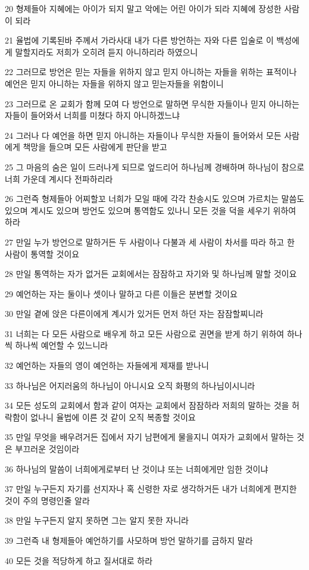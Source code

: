 \par 20 형제들아 지혜에는 아이가 되지 말고 악에는 어린 아이가 되라 지혜에 장성한 사람이 되라
\par 21 율법에 기록된바 주께서 가라사대 내가 다른 방언하는 자와 다른 입술로 이 백성에게 말할지라도 저희가 오히려 듣지 아니하리라 하였으니
\par 22 그러므로 방언은 믿는 자들을 위하지 않고 믿지 아니하는 자들을 위하는 표적이나 예언은 믿지 아니하는 자들을 위하지 않고 믿는자들을 위함이니
\par 23 그러므로 온 교회가 함께 모여 다 방언으로 말하면 무식한 자들이나 믿지 아니하는 자들이 들어와서 너희를 미쳤다 하지 아니하겠느냐
\par 24 그러나 다 예언을 하면 믿지 아니하는 자들이나 무식한 자들이 들어와서 모든 사람에게 책망을 들으며 모든 사람에게 판단을 받고
\par 25 그 마음의 숨은 일이 드러나게 되므로 엎드리어 하나님께 경배하며 하나님이 참으로 너희 가운데 계시다 전파하리라
\par 26 그런즉 형제들아 어찌할꼬 너희가 모일 때에 각각 찬송시도 있으며 가르치는 말씀도 있으며 계시도 있으며 방언도 있으며 통역함도 있나니 모든 것을 덕을 세우기 위하여 하라
\par 27 만일 누가 방언으로 말하거든 두 사람이나 다불과 세 사람이 차서를 따라 하고 한 사람이 통역할 것이요
\par 28 만일 통역하는 자가 없거든 교회에서는 잠잠하고 자기와 및 하나님께 말할 것이요
\par 29 예언하는 자는 둘이나 셋이나 말하고 다른 이들은 분변할 것이요
\par 30 만일 곁에 앉은 다른이에게 계시가 있거든 먼저 하던 자는 잠잠할찌니라
\par 31 너희는 다 모든 사람으로 배우게 하고 모든 사람으로 권면을 받게 하기 위하여 하나씩 하나씩 예언할 수 있느니라
\par 32 예언하는 자들의 영이 예언하는 자들에게 제재를 받나니
\par 33 하나님은 어지러움의 하나님이 아니시요 오직 화평의 하나님이시니라
\par 34 모든 성도의 교회에서 함과 같이 여자는 교회에서 잠잠하라 저희의 말하는 것을 허락함이 없나니 율법에 이른 것 같이 오직 복종할 것이요
\par 35 만일 무엇을 배우려거든 집에서 자기 남편에게 물을지니 여자가 교회에서 말하는 것은 부끄러운 것임이라
\par 36 하나님의 말씀이 너희에게로부터 난 것이냐 또는 너희에게만 임한 것이냐
\par 37 만일 누구든지 자기를 선지자나 혹 신령한 자로 생각하거든 내가 너희에게 편지한 것이 주의 명령인줄 알라
\par 38 만일 누구든지 알지 못하면 그는 알지 못한 자니라
\par 39 그런즉 내 형제들아 예언하기를 사모하며 방언 말하기를 금하지 말라
\par 40 모든 것을 적당하게 하고 질서대로 하라

